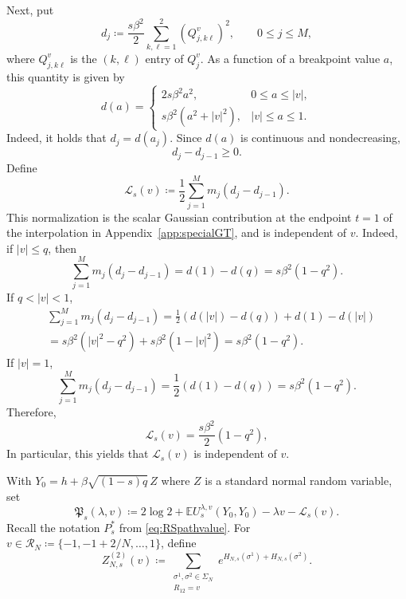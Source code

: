 \documentclass[11pt]{article}
\numberwithin{equation}{section}
\newcommand{\E}{\mathbb{E}}
\newcommand{\R}{\mathbb{R}}
\newcommand{\1}{\mathbf 1}
\begin{document}
Next, put
\begin{equation}\label{eq:defd}
 d_j\coloneqq\frac{s\beta^2}{2}
 \sum_{k,\ell =1}^2(Q_{j,k\ell}^v)^2,
 \qquad 0\le j\le M,
\end{equation}
where $Q_{j,k\ell}^v$ is the $(k,\ell)$ entry of $Q_{j}^v$.
As a function of a breakpoint value $a$, this quantity is given by
\[
 d(a)=
 \begin{cases}
 2s\beta^2a^2,&0\le a\le |v|,\\[1mm]
 s\beta^2(a^2+|v|^2),&|v|\le a\le1.
 \end{cases}
\]
Indeed, it holds that $d_j = d(a_j)$.
Since $d(a)$ is continuous and nondecreasing, 
\begin{equation}\label{eq:finite-step-scalar-increments}
d_j-d_{j-1}\ge0.
\end{equation}
Define
\begin{equation}\label{eq:defLv}
 \mathcal L_s(v)\coloneqq
 \frac12\sum_{j=1}^Mm_j(d_j-d_{j-1}).
\end{equation}
This normalization is the scalar Gaussian contribution at the
endpoint $t=1$ of the interpolation in Appendix~\ref{app:specialGT}, and is independent of $v$.  Indeed, if $|v|\le q$, then
\[
\sum_{j=1}^Mm_j(d_j-d_{j-1}) = d(1)-d(q)=s\beta^2(1-q^2).
\]
If $q<|v| < 1$,
\begin{align*}
&\sum_{j=1}^Mm_j(d_j-d_{j-1})
 =\frac12(d(|v|)-d(q))+d(1)-d(|v|) \\
& =s\beta^2(|v|^2-q^2)+s\beta^2(1-|v|^2)
 =s\beta^2(1-q^2).
\end{align*}
If $|v|=1$,
\[
 \sum_{j=1}^M m_j(d_j-d_{j-1}) = \frac12(d(1)-d(q))=s\beta^2(1-q^2).
\]
Therefore,
\begin{equation}
 \mathcal L_s(v)=\frac{s\beta^2}{2}(1-q^2),
 \label{eq:GTcorrection}
\end{equation}
In particular, this yields that $\mathcal L_s(v)$ is independent of $v$.

With $Y_0=h+\beta\sqrt{(1-s)q}\,Z$ where $Z$ is a standard normal random variable, set
\begin{equation}
 \mathfrak P_s(\lambda,v)
 \coloneqq2\log2+\E U_s^{\lambda,v}(Y_0,Y_0)
 -\lambda v-\mathcal L_s(v).
 \label{eq:GTfunctional}
\end{equation}
Recall the notation $P_s^*$ from \eqref{eq:RSpathvalue}. For  $v\in\mathcal R_N
\coloneqq\{-1,-1+2/N,\ldots,1\}$, define
\begin{equation}
 Z^{(2)}_{N,s}(v)
 \coloneqq
 \sum_{\substack{\sigma^1,\sigma^2\in\Sigma_N\\R_{12}=v}}
 e^{H_{N,s}(\sigma^1)+H_{N,s}(\sigma^2)}.
 \label{eq:constrainedZ}
\end{equation}
\end{document}

